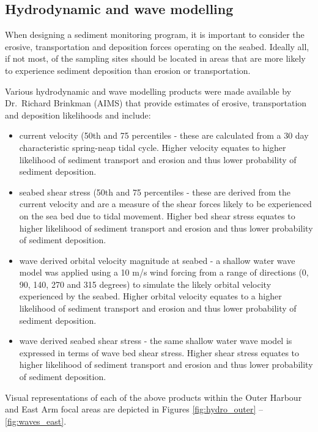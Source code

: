 \documentclass[a4paper]{article}
\begin{document}
\newpage

\hypertarget{hydrodynamic-and-wave-modelling-1}{%
\subsection{Hydrodynamic and wave
modelling}\label{hydrodynamic-and-wave-modelling-1}}

When designing a sediment monitoring program, it is important to
consider the erosive, transportation and deposition forces operating on
the seabed. Ideally all, if not most, of the sampling sites should be
located in areas that are more likely to experience sediment deposition
than erosion or transportation.

Various hydrodynamic and wave modelling products were made available by
Dr.~Richard Brinkman (AIMS) that provide estimates of erosive,
transportation and deposition likelihoods and include:

\begin{itemize}
\tightlist
\item
  current velocity (50th and 75 percentiles - these are calculated from
  a 30 day characteristic spring-neap tidal cycle. Higher velocity
  equates to higher likelihood of sediment transport and erosion and
  thus lower probability of sediment deposition.
\item
  seabed shear stress (50th and 75 percentiles - these are derived from
  the current velocity and are a measure of the shear forces likely to
  be experienced on the sea bed due to tidal movement. Higher bed shear
  stress equates to higher likelihood of sediment transport and erosion
  and thus lower probability of sediment deposition.
\item
  wave derived orbital velocity magnitude at seabed - a shallow water
  wave model was applied using a 10 m/s wind forcing from a range of
  directions (0, 90, 140, 270 and 315 degrees) to simulate the likely
  orbital velocity experienced by the seabed. Higher orbital velocity
  equates to a higher likelihood of sediment transport and erosion and
  thus lower probability of sediment deposition.
\item
  wave derived seabed shear stress - the same shallow water wave model
  is expressed in terms of wave bed shear stress. Higher shear stress
  equates to higher likelihood of sediment transport and erosion and
  thus lower probability of sediment deposition.
\end{itemize}

Visual representations of each of the above products within the Outer
Harbour and East Arm focal areas are depicted in Figures
\ref{fig:hydro_outer} -- \ref{fig:waves_east}.
\end{document}
